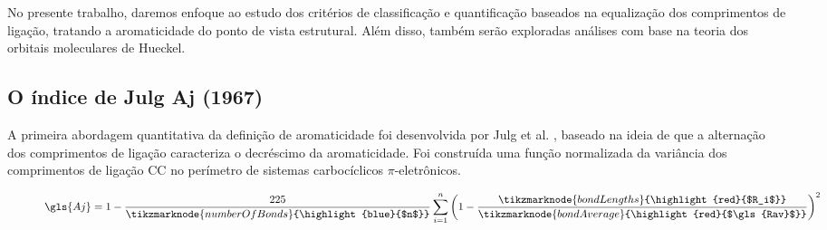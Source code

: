 No presente trabalho, daremos enfoque ao estudo dos critérios de classificação e quantificação baseados na equalização dos comprimentos de ligação, tratando a aromaticidade do ponto de vista estrutural. Além disso, também serão exploradas análises com base na teoria dos orbitais moleculares de Hueckel.

\subsection{O índice de Julg Aj (1967)}

A primeira abordagem quantitativa da definição de aromaticidade foi desenvolvida por Julg et al. \autocite{Julg1967, Bergmann1971}, baseado na ideia de que a alternação dos comprimentos de ligação caracteriza o decréscimo da aromaticidade. Foi construída uma função normalizada da variância dos comprimentos de ligação CC no perímetro de sistemas carbocíclicos $\pi$-eletrônicos.

\begin{figure}[htb]
    \vspace{2\baselineskip}
\begin{equation}
    \label{eq:1}
    \gls{Aj} = 1 - \frac{225}{\tikzmarknode{numberOfBonds}{\highlight{blue}{$n$}}} \sum^n_{i=1} \bigg{(}1 - \frac{\tikzmarknode{bondLengths}{\highlight{red}{$R_i$}}}{\tikzmarknode{bondAverage}{\highlight{red}{$\gls{Rav}$}}} \bigg{)}^2
\end{equation}
    \vspace{4\baselineskip}
\end{figure}

